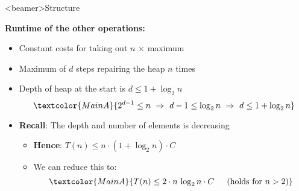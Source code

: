 \setcounter{subsubsection}{0}

\begin{frame}<beamer>{Structure}
\end{frame}

\begin{frame}
  \textbf{Runtime of the other operations:}
  \begin{itemize}
    \item<2- |handout:1>
      Constant costs for taking out {\color{MainA}$n$} $\times$ maximum
    \item<3- |handout:1>
      Maximum of {\color{MainA}$d$} steps repairing the heap
      {\color{MainA}$n$} times
    \item<4- |handout:1>
      Depth of heap at the start is {\color{MainA}$d \leq 1 + \log_2 n$}
      \begin{displaymath}
        \textcolor{MainA}{
          2^{d-1} \leq n
          ~\Rightarrow~
          d - 1 \leq \log_2 n
          ~\Rightarrow~
          d \leq 1 + \log_2 n
        }
      \end{displaymath}
    \item<5- |handout:1>
      \textbf{Recall}: The depth and number of elements is decreasing
      \begin{itemize}
        \item<6- |handout:1>
          \textbf{Hence}:
          {\color{MainA}$T(n) \leq n \cdot (1 +\log_2 n) \cdot C$}
        \item<7- |handout:1>
          We can reduce this to:
          \begin{displaymath}
            \textcolor{MainA}{
              T(n) \leq 2 \cdot n  \, \log_2 n \cdot C
              \hspace{1.5em} (\text{holds for}~n > 2)
            }
          \end{displaymath}
      \end{itemize}
  \end{itemize}
\end{frame}


